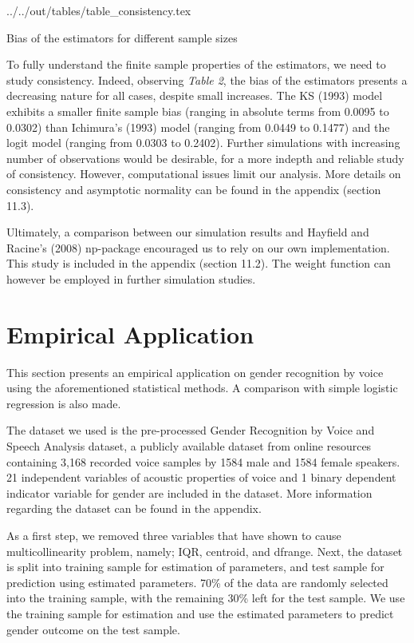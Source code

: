 \begin{table}[H]
\centering
 {../../out/tables/table_consistency.tex}
\caption {Bias of the estimators for different sample sizes} \label{tab:Bias of the estimators}
\end{table}
To fully understand the finite sample properties of the estimators, we need to study consistency. Indeed, observing \textit{Table 2}, the bias of the estimators presents a decreasing nature for all cases, despite small increases. The KS (1993) \cite{[12]} model exhibits a smaller finite sample bias (ranging in absolute terms from 0.0095 to 0.0302) than Ichimura's (1993) \citep{[6]} model (ranging from 0.0449 to 0.1477) and the logit model (ranging from 0.0303 to 0.2402). Further simulations with increasing number of observations would be desirable, for a more indepth and reliable study of consistency. However, computational issues limit our analysis. More details on consistency and asymptotic normality can be found in the appendix (section 11.3).

Ultimately, a comparison between our simulation results and Hayfield and Racine's (2008) np-package \cite{[28]} encouraged us to rely on our own implementation. This study is included in the appendix (section 11.2). The weight function can however be employed in further simulation studies. 

\section{Empirical Application} %
\label{sec:Empirical Application}

This section presents an empirical application on gender recognition by voice using the aforementioned statistical methods. A comparison with simple logistic regression is also made. 

The dataset we used is the pre-processed Gender Recognition by Voice and Speech Analysis dataset, a publicly available dataset from online resources containing 3,168 recorded voice samples by 1584 male and 1584 female speakers. 21 independent variables of acoustic properties of voice and 1 binary dependent indicator variable for gender are included in the dataset. More information regarding the dataset can be found in the appendix.  

As a first step, we removed three variables that have shown to cause multicollinearity problem,  namely; IQR, centroid, and dfrange. Next, the dataset is split into training sample for estimation of parameters, and test sample for prediction using estimated parameters. 70\% of the data are randomly selected into the training sample, with the remaining 30\% left for the test sample. We use the training sample for estimation and use the estimated parameters to predict gender outcome on the test sample.

